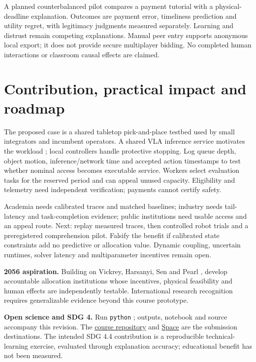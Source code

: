 A planned counterbalanced pilot compares a payment tutorial with a physical-deadline explanation. Outcomes are payment error, timeliness prediction and utility regret, with legitimacy judgments measured separately. Learning and distrust remain competing explanations. Manual peer entry supports anonymous local export; it does not provide secure multiplayer bidding. No completed human interactions or classroom causal effects are claimed.

\section{Contribution, practical impact and roadmap}
The proposed case is a shared tabletop pick-and-place testbed used by small integrators and incumbent operators. A shared VLA inference service motivates the workload \cite{openvla}; local controllers handle protective stopping. Log queue depth, object motion, inference/network time and accepted action timestamps to test whether nominal access becomes executable service. Workers select evaluation tasks for the reserved period and can appeal unused capacity. Eligibility and telemetry need independent verification; payments cannot certify safety.

Academia needs calibrated traces and matched baselines; industry needs tail-latency and task-completion evidence; public institutions need usable access and an appeal route. Next: replay measured traces, then controlled robot trials and a preregistered comprehension pilot. Falsify the benefit if calibrated state constraints add no predictive or allocation value. Dynamic coupling, uncertain runtimes, solver latency and multiparameter incentives remain open.

\textbf{2056 aspiration.} Building on Vickrey, Harsanyi, Sen and Pearl \cite{vickrey,harsanyi,sen,pearl}, develop accountable allocation institutions whose incentives, physical feasibility and human effects are independently testable. International research recognition requires generalizable evidence beyond this course prototype.

\textbf{Open science and SDG 4.} Run \texttt{python} ; outputs, notebook and source accompany this revision. The \href{https://github.com/dku-comsci-econ206-Autumn2026/-PS2-FP9-ComputeCommons}{course repository} and \href{https://huggingface.co/spaces/dku-comsci-econ206-2026/compute-commons}{Space} are the submission destinations. The intended SDG 4.4 contribution is a reproducible technical-learning exercise, evaluated through explanation accuracy; educational benefit has not been measured.
